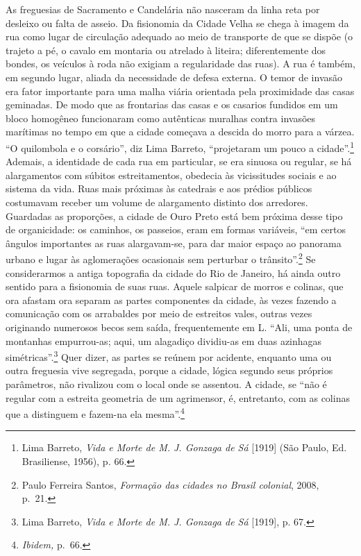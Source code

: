 As freguesias de Sacramento e Candelária não nasceram da linha reta por
desleixo ou falta de asseio. Da fisionomia da Cidade Velha se chega à
imagem da rua como lugar de circulação adequado ao meio de transporte de
que se dispõe (o trajeto a pé, o cavalo em montaria ou atrelado à
liteira; diferentemente dos bondes, os veículos à roda não exigiam a
regularidade das ruas). A rua é também, em segundo lugar, aliada da
necessidade de defesa externa. O temor de invasão era fator importante
para uma malha viária orientada pela proximidade das casas geminadas. De
modo que as frontarias das casas e os casarios fundidos em um bloco
homogêneo funcionaram como autênticas muralhas contra invasões marítimas
no tempo em que a cidade começava a descida do morro para a várzea. ``O
quilombola e o corsário'', diz Lima Barreto, ``projetaram um pouco a
cidade''.\footnote{Lima Barreto, \textit{Vida e Morte de M. J. Gonzaga de
  Sá} {[}1919{]} (São Paulo, Ed. Brasiliense, 1956), p\textit{.} 66.}
Ademais, a identidade de cada rua em particular, se era sinuosa ou
regular, se há alargamentos com súbitos estreitamentos, obedecia às
vicissitudes sociais e ao sistema da vida. Ruas mais próximas às
catedrais e aos prédios públicos costumavam receber um volume de
alargamento distinto dos arredores. Guardadas as proporções, a cidade de
Ouro Preto está bem próxima desse tipo de organicidade: os caminhos, os
passeios, eram em formas variáveis, ``em certos ângulos importantes as
ruas alargavam-se, para dar maior espaço ao panorama urbano e lugar às
aglomerações ocasionais sem perturbar o trânsito''.\footnote{Paulo
  Ferreira Santos, \textit{Formação das cidades no Brasil colonial}, 2008,
  p.~21.} Se considerarmos a antiga topografia da cidade do Rio de
Janeiro, há ainda outro sentido para a fisionomia de suas ruas. Aquele
salpicar de morros e colinas, que ora afastam ora separam as partes
componentes da cidade, às vezes fazendo a comunicação com os arrabaldes
por meio de estreitos vales, outras vezes originando numerosos becos sem
saída, frequentemente em L. ``Ali, uma ponta de montanhas empurrou-as;
aqui, um alagadiço dividiu-as em duas azinhagas simétricas''.\footnote{Lima
  Barreto, \textit{Vida e Morte de M. J. Gonzaga de Sá} {[}1919{]}, p. 67.}
Quer dizer, as partes se reúnem por acidente, enquanto uma ou outra
freguesia vive segregada, porque a cidade, lógica segundo seus próprios
parâmetros, não rivalizou com o local onde se assentou. A cidade, se
``não é regular com a estreita geometria de um agrimensor, é,
entretanto, com as colinas que a distinguem e fazem-na ela
mesma''.\footnote{\textit{Ibidem,} p.~66.}

